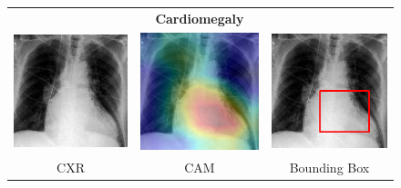 \begin{figure}[htbp!]
\centering
\begin{tabular}{ccc}
 &\textbf{Cardiomegaly}& \\
\vspace{2mm}
  \includegraphics[width=35mm]{Tesi/images/CAMs/CAM7/image.png} &   
  \includegraphics[width=35mm]{Tesi/images/CAMs/CAM7/image_cam.png} &   
  \includegraphics[width=35mm]{Tesi/images/CAMs/CAM7/image_bbox.png} \\
\footnotesize{CXR} & \footnotesize{CAM} & \footnotesize{Bounding Box} \\[6pt]
\end{tabular}
\caption[Cadiomegaly CAM-2]{}
\label{fig:figure_5.21}
\end{figure}


